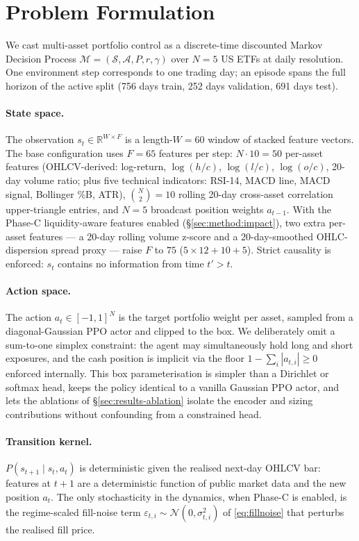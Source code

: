 \documentclass[conference]{IEEEtran}
\begin{document}
\section{Problem Formulation}
\label{sec:problem}

We cast multi-asset portfolio control as a discrete-time discounted Markov
Decision Process $\mathcal{M} = (\mathcal{S}, \mathcal{A}, P, r, \gamma)$
over $N{=}5$ US ETFs at daily resolution. One environment step corresponds
to one trading day; an episode spans the full horizon of the active
split (756 days train, 252 days validation, 691 days test).

\paragraph{State space.} The observation $s_t \in \mathbb{R}^{W \times F}$
is a length-$W{=}60$ window of stacked feature vectors. The base
configuration uses $F = 65$ features per step:
$N \cdot 10 = 50$ per-asset features (OHLCV-derived: log-return,
$\log(h/c)$, $\log(l/c)$, $\log(o/c)$, 20-day volume ratio; plus five
technical indicators: RSI-14, MACD line, MACD signal, Bollinger \%B,
ATR), $\binom{N}{2} = 10$ rolling 20-day cross-asset correlation
upper-triangle entries, and $N = 5$ broadcast position weights
$a_{t-1}$. With the Phase-C liquidity-aware features enabled
(\S\ref{sec:method:impact}), two extra per-asset features --- a 20-day
rolling volume z-score and a 20-day-smoothed OHLC-dispersion spread
proxy --- raise $F$ to $75$ ($5 \times 12 + 10 + 5$). Strict causality
is enforced: $s_t$ contains no information from time $t' > t$.

\paragraph{Action space.} The action $a_t \in [-1, 1]^{N}$ is the target
portfolio weight per asset, sampled from a diagonal-Gaussian PPO actor
and clipped to the box. We deliberately omit a sum-to-one simplex
constraint: the agent may simultaneously hold long and short exposures,
and the cash position is implicit via the floor
$1 - \sum_i |a_{t,i}| \ge 0$ enforced internally. This box
parameterisation is simpler than a Dirichlet or softmax head, keeps the
policy identical to a vanilla Gaussian PPO actor, and lets the
ablations of \S\ref{sec:results-ablation} isolate the encoder and
sizing contributions without confounding from a constrained head.

\paragraph{Transition kernel.} $P(s_{t+1}\mid s_t, a_t)$ is deterministic
given the realised next-day OHLCV bar: features at $t+1$ are a
deterministic function of public market data and the new position
$a_t$. The only stochasticity in the dynamics, when Phase-C is enabled,
is the regime-scaled fill-noise term
$\varepsilon_{t,i} \sim \mathcal{N}(0, \sigma_{t,i}^{2})$ of
\eqref{eq:fillnoise} that perturbs the realised fill price.
\end{document}
